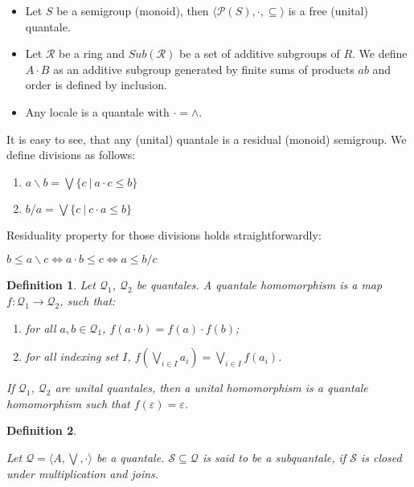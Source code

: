 \documentclass[a4paper]{article}
\theoremstyle{defin}
\newtheorem{defin}{Definition}
\theoremstyle{theorem}
\theoremstyle{prop}
\theoremstyle{lemma}
\theoremstyle{ex}
\theoremstyle{col}
\begin{document}
\begin{itemize}
\item Let $S$ be a semigroup (monoid), then $\langle \mathcal{P}(S), \cdot, \subseteq \rangle$
is a free (unital) quantale.
\item Let $\mathcal{R}$ be a ring and $Sub(\mathcal{R})$ be a set of additive subgroups of $R$.
We define $A \cdot B$ as an additive subgroup generated by finite sums of products $ab$ and order is defined by inclusion.
\item Any locale is a quantale with $\cdot = \wedge$.
\end{itemize}

It is easy to see, that any (unital) quantale is a residual (monoid) semigroup. We define divisions as follows:

\begin{enumerate}
\item $a \backslash b = \bigvee \{ c \: | \: a \cdot c \leq b \}$
\item $b / a = \bigvee \{ c \: | \: c \cdot a \leq b \}$
\end{enumerate}

Residuality property for those divisions holds straightforwardly:

\begin{center}
  $b \leq a \backslash c \Leftrightarrow a \cdot b \leq c \Leftrightarrow a \leq b / c$
\end{center}

\begin{defin}

  Let $\mathcal{Q}_1$, $\mathcal{Q}_2$ be quantales. A quantale homomorphism is a map $f : \mathcal{Q}_1 \to \mathcal{Q}_2$, such that:

  \begin{enumerate}
    \item for all $a,b \in \mathcal{Q}_1$, $f(a \cdot b) = f(a) \cdot f(b)$;
    \item for all indexing set $I$, $f(\bigvee \limits_{i \in I} a_i) = \bigvee \limits_{i \in I} f(a_i)$.
  \end{enumerate}

  If $\mathcal{Q}_1$, $\mathcal{Q}_2$ are unital quantales, then a unital homomorphism is a quantale homomorphism such that $f(\varepsilon) = \varepsilon$.
\end{defin}

\begin{defin}
$ $

  Let $\mathcal{Q} = \langle A, \bigvee, \cdot \rangle$ be a quantale. $\mathcal{S} \subseteq \mathcal{Q}$ is said to be a subquantale, if $\mathcal{S}$ is closed under multiplication and joins.
\end{defin}
\end{document}
